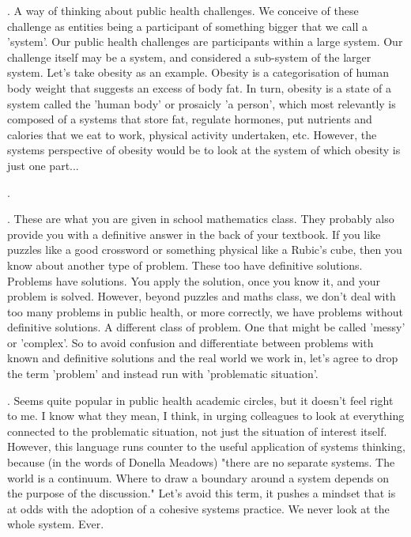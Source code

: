 . A way of thinking about public health challenges. We conceive of these challenge as entities being a participant of something bigger that we call a 'system'. Our public health challenges are participants within a large system. Our challenge itself may be a system, and considered a sub-system of the larger system. Let's take obesity as an example. Obesity is a categorisation of human body weight that suggests an excess of body fat. In turn, obesity is a state of a system called the 'human body' or prosaicly 'a person', which most relevantly is composed of a systems that store fat, regulate hormones, put nutrients and calories that we eat to work, physical activity undertaken, etc. However, the systems perspective of obesity would be to look at the system of which obesity is just one part...

.

. These are what you are given in school mathematics class. They probably also provide you with a definitive answer in the back of your textbook. If you like puzzles like a good crossword or something physical like a Rubic's cube, then you know about another type of problem. These too have definitive solutions. Problems have solutions. You apply the solution, once you know it, and your problem is solved. However, beyond puzzles and maths class, we don't deal with too many problems in public health, or more correctly, we have problems without definitive solutions. A different class of problem. One that might be called 'messy' or 'complex'. So to avoid confusion and differentiate between problems with known and definitive solutions and the real world we work in, let's agree to drop the term 'problem' and instead run with 'problematic situation'.


. Seems quite popular in public health academic circles, but it doesn't feel right to me. I know what they mean, I think, in urging colleagues to look at everything connected to the problematic situation, not just the situation of interest itself. However, this language runs counter to the useful application of systems thinking, because (in the words of Donella Meadows) "there are no separate systems. The world is a continuum. Where to draw a boundary around a system depends on the purpose of the discussion." Let's avoid this term, it pushes a mindset that is at odds with the adoption of a cohesive systems practice. We never look at the whole system. Ever.

